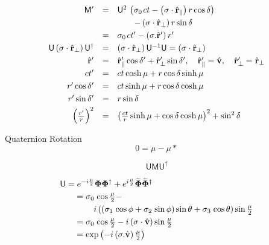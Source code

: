 \documentclass[aps,twocolumn,secnumarabic,nobalancelastpage,amsmath,amssymb,
amsthm,nofootinbib,parskip=full]{revtex4}
\numberwithin{equation}{section}
\newcommand{\spin}[1]{\mathbf{#1}}
\newcommand{\adjoint}[1]{\widetilde{#1}}
\newcommand{\uvector}[1]{\hat{\mathbf{#1}}}
\newcommand{\pauli}[1]{\sigma_#1\mkern2mu}
\newcommand{\qv}[1]{\mathbf{\mathsf{#1}}}
\begin{document}
\begin{equation*}
\begin{array}{rcl}
\qv{M}^\prime&=&
\qv{U}^2\,\left(\pauli{0}ct-
\left(\sigma\cdot\uvector{r}_\parallel\right)r\cos\delta\right) \\[3pt]
&&\qquad-\left(\sigma\cdot\uvector{r}_\perp\right)r\sin\delta \\[3pt]
&=&\pauli{0}ct^\prime-\left(\sigma.\uvector{r}^\prime\right)r^\prime \\[3pt]
\qv{U}\left(\sigma\cdot\uvector{r}_\perp\right)\qv{U}^\dagger&=&
\left(\sigma\cdot\uvector{r}_\perp\right)\qv{U}^{-1}\qv{U}=
\left(\sigma\cdot\uvector{r}_\perp\right) \\[3pt]
\uvector{r}^\prime&=&
    \uvector{r}^\prime_\parallel\cos\delta^\prime+
    \uvector{r}^\prime_\perp\sin\delta^\prime, 
    \quad\uvector{r}^\prime_\parallel=\uvector{v},
    \quad\uvector{r}^\prime_\perp=\uvector{r}_\perp \\[3pt]
ct^\prime&=&ct\cosh\mu+r\cos\delta\sinh\mu \\[3pt]
r^\prime\cos\delta^\prime&=&ct\sinh\mu+r\cos\delta\cosh\mu \\[3pt]
r^\prime\sin\delta^\prime&=&r\sin\delta \\[3pt]
\left(\frac{r^\prime}{r}\right)^2&=&
              \left(\frac{ct}{r}\sinh\mu+\cos\delta\cosh\mu\right)^2+
              \sin^2\delta
\end{array}
\end{equation*}

Quaternion Rotation
\begin{equation*}
0=\mu-\mu*
\end{equation*}

\begin{equation*}
\qv{U}\qv{M}\qv{U}^\dagger
\end{equation*}

\begin{equation*}
\begin{array}{l}
\qv{U}=e^{-i\frac{\mu}{2}}\spin{\Phi}\spin{\Phi}^\dagger+
e^{i\frac{\mu}{2}}\adjoint{\spin{\Phi}}\adjoint{\spin{\Phi}}^\dagger \\[3pt]
\qquad =\pauli{0}\cos\frac{\mu}{2}- \\[3pt]
\qquad\qquad i\left(
\left(\pauli{1}\cos\phi+\pauli{2}\sin\phi\right)\sin\theta+
\pauli{3}\cos\theta\right)\sin\frac{\mu}{2} \\[3pt]
\qquad =\pauli{0}\cos\frac{\mu}{2}-
i\left(\sigma\cdot\uvector{v}\right)\sin\frac{\mu}{2} \\[3pt]
\qquad =\exp\left(-i\left(\sigma.\uvector{v}\right)\frac{\mu}{2}\right)
\end{array}
\end{equation*}
\end{document}
